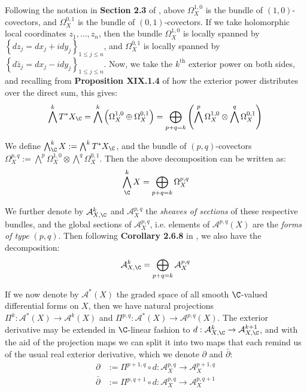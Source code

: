 \noindent Following the notation in \textbf{Section 2.3} of \cite{VoisinI2002}, above $\Omega^{1,0}_X$ is the bundle of $(1,0)$-covectors, and $\Omega^{0,1}_X$ is the bundle of $(0,1)$-covectors. If we take holomorphic local coordinates $z_1, \ldots, z_n$, then the bundle $\Omega^{1,0}_X$ is locally spanned by $\left\{dz_j = dx_j + i dy_j\right\}_{1\leq j\leq n}$, and $\Omega^{0,1}_X$ is locally spanned by $\left\{d\bar{z}_j = dx_j - i dy_j\right\}_{1\leq j\leq n}$. Now, we take the $k^\text{th}$ exterior power on both sides, and recalling from \textbf{Proposition XIX.1.4} of \cite{Lang2002} how the exterior power distributes over the direct sum, this gives:
$$
\bigwedge^kT^*X_\C = \bigwedge^k\left(\Omega^{1,0}_X \oplus \Omega^{0,1}_X\right) = \bigoplus_{p+q=k}\left( \bigwedge^p\Omega^{1,0}_X \otimes \bigwedge^q \Omega^{0,1}_X\right)
$$

\noindent We define $\bigwedge^k_\C X:=\bigwedge^k T^* X_\C$, and the bundle of $(p,q)$-covectors $\Omega^{p,q}_X:=\bigwedge^p \Omega^{1,0}_X \otimes \bigwedge^q \Omega^{0,1}_X$. Then the above decomposition can be written as:
$$
\bigwedge^k_\C X = \bigoplus_{p+q=k} \Omega_X^{p,q}
$$

\noindent We further denote by $\mathcal{A}^k_{X,\C}$ and $\mathcal{A}^{p,q}_X$ the \emph{sheaves of sections} of these respective bundles, and the global sections of $\mathcal{A}^{p,q}_X$, i.e. elements of $\mathcal{A}^{p,q}(X)$ are the \emph{forms of type} $(p,q)$. Then following \textbf{Corollary 2.6.8} in \cite{Huybrechts2005}, we also have the decomposition:
$$
\mathcal{A}^k_{X,\C} = \bigoplus_{p+q=k} \mathcal{A}^{p,q}_X
$$

\noindent If we now denote by $\mathcal{A}^*(X)$ the graded space of all smooth $\C$-valued differential forms on $X$, then we have natural projections $\Pi^{k}:\mathcal{A}^*(X)\to \mathcal{A}^k(X)$ and $\Pi^{p,q}:\mathcal{A}^*(X)\to \mathcal{A}^{p,q}(X)$. The exterior derivative may be extended in $\C$-linear fashion to $d:\mathcal{A}^k_{X,\C}\to \mathcal{A}^{k+1}_{X,\C}$, and with the aid of the projection maps we can split it into two maps that each remind us of the usual real exterior derivative, which we denote $\partial$ and $\bar \partial$:
\begin{align*}
    \partial &:= \Pi^{p+1,q}\circ d:\mathcal{A}^{p,q}_X\to \mathcal{A}^{p+1,q}_X \\
    \bar \partial &:= \Pi^{p,q+1}\circ d:\mathcal{A}^{p,q}_X\to \mathcal{A}^{p,q+1}_X
\end{align*}

